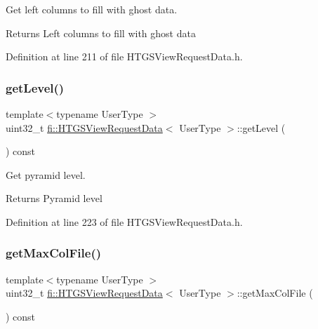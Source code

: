 Get left columns to fill with ghost data. 

\begin{DoxyReturn}{Returns}
Left columns to fill with ghost data 
\end{DoxyReturn}


Definition at line 211 of file H\+T\+G\+S\+View\+Request\+Data.\+h.

\mbox{\label{classfi_1_1HTGSViewRequestData_a960534d61373c3f310f248b3ceec7cb4}} 
\subsubsection{\texorpdfstring{get\+Level()}{getLevel()}}
{\footnotesize\ttfamily template$<$typename User\+Type $>$ \\
uint32\+\_\+t \hyperlink{classfi_1_1HTGSViewRequestData}{fi\+::\+H\+T\+G\+S\+View\+Request\+Data}$<$ User\+Type $>$\+::get\+Level (\begin{DoxyParamCaption}{ }\end{DoxyParamCaption}) const\hspace{0.3cm}{\ttfamily [inline]}}



Get pyramid level. 

\begin{DoxyReturn}{Returns}
Pyramid level 
\end{DoxyReturn}


Definition at line 223 of file H\+T\+G\+S\+View\+Request\+Data.\+h.

\mbox{\label{classfi_1_1HTGSViewRequestData_a1a86afeba8d7325e353557394842fd7f}} 
\subsubsection{\texorpdfstring{get\+Max\+Col\+File()}{getMaxColFile()}}
{\footnotesize\ttfamily template$<$typename User\+Type $>$ \\
uint32\+\_\+t \hyperlink{classfi_1_1HTGSViewRequestData}{fi\+::\+H\+T\+G\+S\+View\+Request\+Data}$<$ User\+Type $>$\+::get\+Max\+Col\+File (\begin{DoxyParamCaption}{ }\end{DoxyParamCaption}) const\hspace{0.3cm}{\ttfamily [inline]}}



